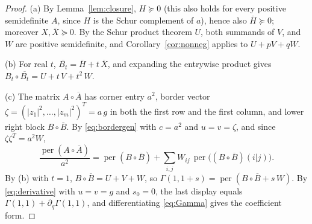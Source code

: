 \documentclass[11pt]{amsart}
\theoremstyle{remark}
\numberwithin{equation}{section}
\newcommand{\per}{\operatorname{per}}
\newcommand{\conj}[1]{\overline{#1}}
\begin{document}
\begin{proof}
(a) By Lemma~\ref{lem:closure}, $H\succeq0$ (this also holds for every positive semidefinite $A$, since $H$ is the Schur complement of $a$), hence also $\conj{H}\succeq0$; moreover $X,\conj{X}\succeq0$. By the Schur product theorem $U$, both summands of $V$, and $W$ are positive semidefinite, and Corollary~\ref{cor:nonneg} applies to $U+pV+qW$.

(b) For real $t$, $\conj{B_t}=\conj{H}+t\,\conj{X}$, and expanding the entrywise product gives $B_t\circ\conj{B_t}=U+t\,V+t^2\,W$.

(c) The matrix $A\circ\conj{A}$ has corner entry $a^2$, border vector $\zeta=(|z_1|^2,\dots,|z_m|^2)^T=a\,g$ in both the first row and the first column, and lower right block $B\circ\conj{B}$. By \eqref{eq:bordergen} with $c=a^2$ and $u=v=\zeta$, and since $\zeta\zeta^T=a^2W$,
\[
\frac{\per(A\circ\conj{A})}{a^2}=\per(B\circ\conj{B})+\sum_{i,j}W_{ij}\,\per\bigl((B\circ\conj{B})(i|j)\bigr).
\]
By (b) with $t=1$, $B\circ\conj{B}=U+V+W$, so $\Gamma(1,1+s)=\per(B\circ\conj{B}+s\,W)$. By \eqref{eq:derivative} with $u=v=g$ and $s_0=0$, the last display equals $\Gamma(1,1)+\partial_q\Gamma(1,1)$, and differentiating \eqref{eq:Gamma} gives the coefficient form.
\end{proof}
\end{document}
